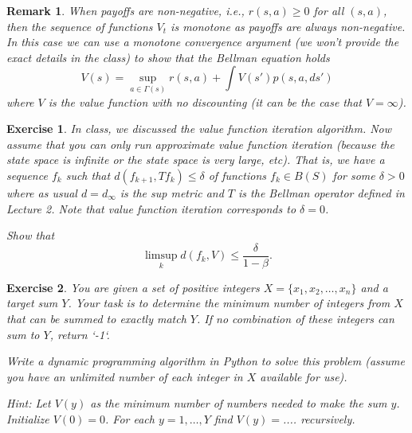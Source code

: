 \documentclass[letter,11pt]{article}
\newtheorem{exercise}{Exercise}[section]
\newtheorem{remark}{Remark}[section]
\begin{document}
\begin{remark}
    When payoffs are non-negative, i.e., $r (s,a) \geq 0$ for all $(s,a)$, then the sequence of functions $V_{t}$ is monotone as payoffs are always non-negative. In this case we can use a monotone convergence argument (we won't provide the exact details in the class) to show that the Bellman equation holds
$$V (s) = \sup _{a \in \Gamma(s)} r(s,a) + \int V(s') p(s,a,ds') $$ 
where $V$ is the value function with no discounting (it can be the case that $V=\infty$). 
\end{remark}



\begin{exercise}
    In class, we discussed the value function iteration algorithm. Now assume that you can only run approximate value function iteration (because the state space is infinite or the state space is very large, etc). That is, we have a sequence $f_{k}$ such that $d (f_{k+1},Tf_{k}) \leq \delta$ of functions $f_{k} \in B(S)$ for some $\delta >0$ where as usual $d = d_{\infty}$ is the sup metric and $T$ is the Bellman operator defined in Lecture  2. Note that value function iteration corresponds to  $\delta = 0$.  

     Show that 
    $$ \limsup _{k} d (f_{k},V) \leq \frac{\delta}{1-\beta}.$$
\end{exercise}







\begin{exercise}
    You are given a set of positive integers $X = \{x_{1}, x_{2}, \ldots, x_{n}\}$ and a target sum $Y$. Your task is to determine the minimum number of integers from $X$ that can be summed to exactly match $Y$. If no combination of these integers can sum to $Y$, return `-1`.

    Write a dynamic programming algorithm in Python to solve this problem (assume you have an unlimited number of each integer in $X$ available for use). 

    Hint: Let $V(y)$ as the minimum number of numbers needed to make the sum $y$. Initialize $V(0) = 0$. For each $y=1,\ldots,Y$ find $V(y) = $.... recursively. 
\end{exercise}
\end{document}

